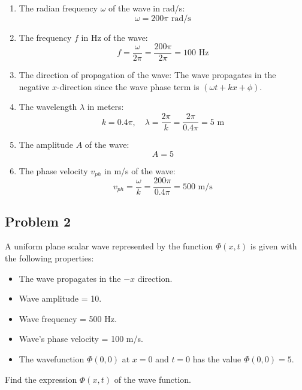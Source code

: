 \documentclass{article}
\begin{document}
\begin{enumerate}
    \item The radian frequency $\omega$ of the wave in rad/s:
    \begin{equation}
        \omega = 200\pi \text{ rad/s}
    \end{equation}
    \item The frequency $f$ in Hz of the wave:
    \begin{equation}
        f = \frac{\omega}{2\pi} = \frac{200\pi}{2\pi} = 100 \text{ Hz}
    \end{equation}
    \item The direction of propagation of the wave:
    \newline The wave propagates in the negative $x$-direction since the wave phase term is $(\omega t + kx + \phi)$.
    \item The wavelength $\lambda$ in meters:
    \begin{equation}
        k = 0.4\pi, \quad \lambda = \frac{2\pi}{k} = \frac{2\pi}{0.4\pi} = 5 \text{ m}
    \end{equation}
    \item The amplitude $A$ of the wave:
    \begin{equation}
        A = 5
    \end{equation}
    \item The phase velocity $v_{ph}$ in m/s of the wave:
    \begin{equation}
        v_{ph} = \frac{\omega}{k} = \frac{200\pi}{0.4\pi} = 500 \text{ m/s}
    \end{equation}
\end{enumerate}

\subsection{Problem 2}
A uniform plane scalar wave represented by the function $\Phi(x,t)$ is given with the following properties:
\begin{itemize}
    \item The wave propagates in the $-x$ direction.
    \item Wave amplitude = 10.
    \item Wave frequency = 500 Hz.
    \item Wave’s phase velocity = 100 m/s.
    \item The wavefunction $\Phi(0,0)$ at $x = 0$ and $t = 0$ has the value $\Phi(0,0) = 5$.
\end{itemize}
Find the expression $\Phi(x,t)$ of the wave function.
\end{document}
